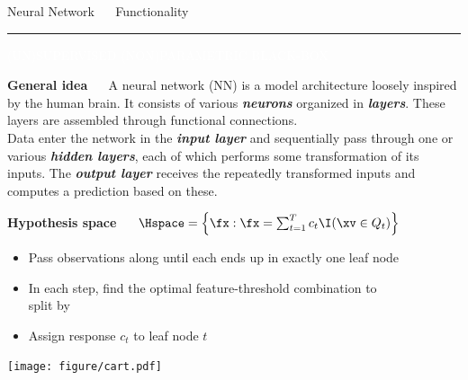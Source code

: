 \documentclass[11pt,compress,t,notes=noshow, xcolor=table]{beamer}
\begin{document}
\LARGE
\begin{frame}{\textcolor{gray!80}{Neural Network} ~~ Functionality}
\normalsize
\vspace{-0.5cm}
\noindent \textcolor{gray!80}{\rule{\textwidth}{1pt}}

\vspace{0.3cm}

\footnotesize

\colorbox{gray!80}{\textcolor{white}{(UN)SUPERVISED}}
\colorbox{gray!80}{\textcolor{white}{(NON)PARAMETRIC}}
\colorbox{gray!80}{\textcolor{white}{BLACK-BOX}}

\medskip

\textbf{\textcolor{gray!80}{General idea}} ~~ A neural network (NN) is a model
architecture loosely inspired by the human brain. It consists of various
\textit{\textbf{neurons}} organized in \textit{\textbf{layers}}. These layers
are assembled through functional connections. 
\\ Data enter the network in
the \textit{\textbf{input layer}} and sequentially pass through one or various
\textit{\textbf{hidden layers}}, each of which performs some transformation of
its inputs. The \textit{\textbf{output layer}} receives the repeatedly
transformed inputs and computes a prediction based on these.

\medskip
 
\textbf{\textcolor{gray!80}{Hypothesis space}} ~~
$\Hspace = \left\{ \fx: \fx = \sum_{t = 1}^T c_t \I(\xv \in Q_t) 
\right\}$

\medskip

\begin{minipage}{0.6\textwidth}
  \begin{itemize}
    \item Pass observations along until each ends up in exactly 
    one leaf node
    \item In each step, find the optimal feature-threshold
    combination to \\ split by
  \item Assign response $c_t$ to leaf node $t$
\end{itemize}

\end{minipage}%
\begin{minipage}{0.4\textwidth}
  \texttt{[image: figure/cart.pdf]}
\end{minipage}

% 
% 


\end{frame}
\end{document}

